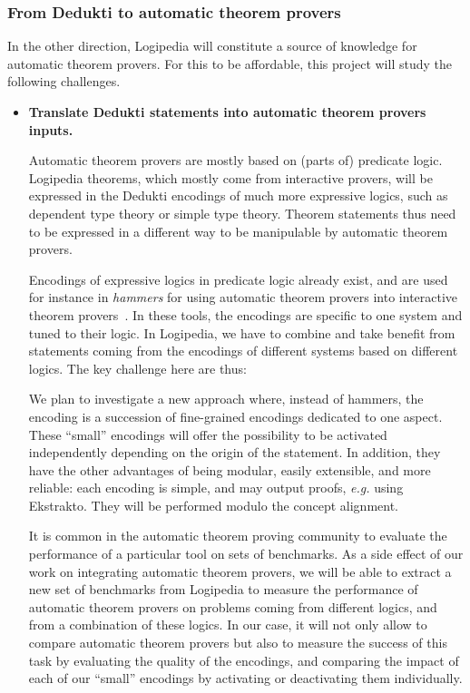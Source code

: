 \subsubsection*{From Dedukti to automatic theorem provers}

In the other direction, Logipedia will constitute a source of
knowledge for automatic theorem provers. For this to be affordable,
this project will study the following challenges.

\begin{itemize}
\item{\bf Translate Dedukti statements into automatic theorem provers
  inputs.}

Automatic theorem provers are mostly based on (parts of) predicate
logic.  Logipedia theorems, which mostly come from interactive
provers, will be expressed in the Dedukti encodings of much more
expressive logics, such as dependent type theory or simple type
theory.  Theorem statements thus need to be expressed in a different way
to be manipulable by automatic theorem provers.

Encodings of expressive logics in predicate logic already exist, and are used
for instance in {\em hammers} for using automatic theorem provers into
interactive theorem
provers~\cite{DBLP:conf/lpar/PaulsonB10,DBLP:journals/jar/CzajkaK18}.  In these
tools, the encodings are specific to one system and tuned to their logic. In
Logipedia, we have to combine and take benefit from statements coming from the
encodings of different systems based on different logics. The key challenge here
are thus:

We plan to investigate a new approach where, instead of hammers, the
encoding is a succession of fine-grained encodings dedicated to one
aspect. These ``small'' encodings will offer the possibility to be
activated independently depending on the origin of the statement. In
addition, they have the other advantages of being modular, easily
extensible, and more reliable: each encoding is simple, and may output
proofs, {\em e.g.} using Ekstrakto. They will be performed modulo the
concept alignment.

It is common in the automatic theorem proving community to evaluate
the performance of a particular tool on sets of benchmarks. As a side
effect of our work on integrating automatic theorem provers, we will
be able to extract a new set of benchmarks from Logipedia to measure
the performance of automatic theorem provers on problems coming from
different logics, and from a combination of these logics. In our case,
it will not only allow to compare automatic theorem provers but also
to measure the success of this task by evaluating the quality of the
encodings, and comparing the impact of each of our ``small'' encodings
by activating or deactivating them individually.


\end{itemize}
